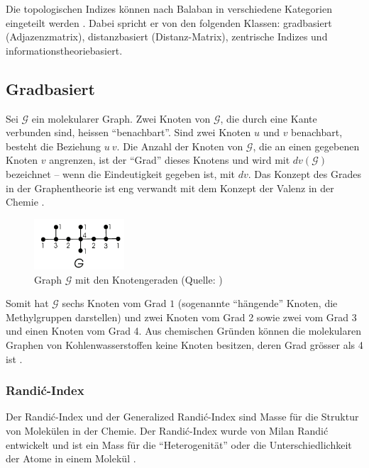Die topologischen Indizes können nach Balaban in verschiedene Kategorien eingeteilt werden \cite{balaban_1983_2014}.
Dabei spricht er von den folgenden Klassen: gradbasiert (Adjazenzmatrix), distanzbasiert (Distanz-Matrix), zentrische Indizes und informationstheoriebasiert.

\subsection{Gradbasiert}

Sei $\mathcal{G}$ ein molekularer Graph. Zwei Knoten von $\mathcal{G}$, die durch eine Kante verbunden sind, heissen \enquote{benachbart}.
Sind zwei Knoten $u$ und $v$ benachbart, besteht die Beziehung $u ~ v$.
Die Anzahl der Knoten von $\mathcal{G}$, die an einen gegebenen Knoten $v$ angrenzen, ist der \enquote{Grad} dieses Knotens und wird mit $dv(\mathcal{G})$ bezeichnet – wenn die Eindeutigkeit gegeben ist, mit $dv$.
Das Konzept des Grades in der Graphentheorie ist eng verwandt mit dem Konzept der Valenz in der Chemie \cite[p.~351]{gutman_degree-based_2013}.

\begin{figure}[H]
    \centering
    \includegraphics[width=0.3\textwidth]{images/20_material_methods/degree_graph.png}
    \caption{Graph $\mathcal{G}$ mit den Knotengeraden (Quelle: \cite[p.~351]{gutman_degree-based_2013})}
    \label{fig:degree_graph}
\end{figure}

Somit hat $\mathcal{G}$ sechs Knoten vom Grad $1$ (sogenannte \enquote{hängende} Knoten, die Methylgruppen darstellen) und zwei Knoten vom Grad 2 sowie zwei vom Grad 3 und einen Knoten vom Grad 4. Aus chemischen Gründen können die molekularen Graphen von Kohlenwasserstoffen keine Knoten besitzen, deren Grad grösser als 4 ist \cite[p.~351]{gutman_degree-based_2013}.

\subsubsection{Randić-Index}

Der Randić-Index und der Generalized Randić-Index sind Masse für die Struktur von Molekülen in der Chemie.
Der Randić-Index wurde von Milan Randić entwickelt und ist ein Mass für die \enquote{Heterogenität} oder die Unterschiedlichkeit der Atome in einem Molekül \cite{li_survey_2008}.

